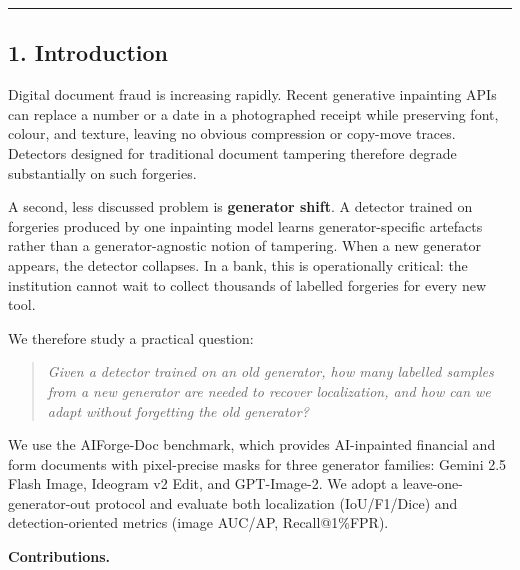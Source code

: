 \begin{center}\rule{0.5\linewidth}{0.5pt}\end{center}

\subsection{1. Introduction}\label{introduction}

Digital document fraud is increasing rapidly. Recent generative inpainting APIs can replace a number or a date in a photographed receipt while preserving font, colour, and texture, leaving no obvious compression or copy-move traces. Detectors designed for traditional document tampering therefore degrade substantially on such forgeries.

A second, less discussed problem is \textbf{generator shift}. A detector trained on forgeries produced by one inpainting model learns generator-specific artefacts rather than a generator-agnostic notion of tampering. When a new generator appears, the detector collapses. In a bank, this is operationally critical: the institution cannot wait to collect thousands of labelled forgeries for every new tool.

We therefore study a practical question:

\begin{quote}
\emph{Given a detector trained on an old generator, how many labelled samples from a new generator are needed to recover localization, and how can we adapt without forgetting the old generator?}
\end{quote}

We use the AIForge-Doc benchmark, which provides AI-inpainted financial and form documents with pixel-precise masks for three generator families: Gemini 2.5 Flash Image, Ideogram v2 Edit, and GPT-Image-2. We adopt a leave-one-generator-out protocol and evaluate both localization (IoU/F1/Dice) and detection-oriented metrics (image AUC/AP, Recall@1\%FPR).

\textbf{Contributions.}

